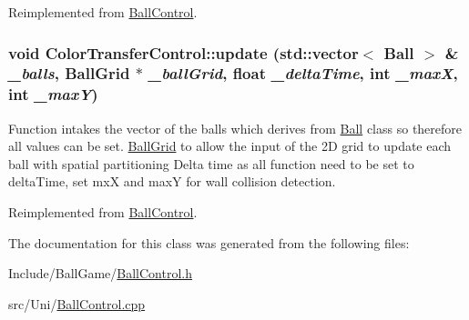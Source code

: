 Reimplemented from \hyperlink{classBallControl_a4f811993f5e8988eb4f4ab3c03dadf52}{BallControl}.\hypertarget{classColorTransferControl_acbe9581f0be7624c9bc33d40e2ee1a6b}{
\subsubsection[{update}]{\setlength{\rightskip}{0pt plus 5cm}void ColorTransferControl::update (std::vector$<$ {\bf Ball} $>$ \& {\em \_\-balls}, \/  {\bf BallGrid} $\ast$ {\em \_\-ballGrid}, \/  float {\em \_\-deltaTime}, \/  int {\em \_\-maxX}, \/  int {\em \_\-maxY})}}
\label{classColorTransferControl_acbe9581f0be7624c9bc33d40e2ee1a6b}
Function intakes the vector of the balls which derives from \hyperlink{structBall}{Ball} class so therefore all values can be set. \hyperlink{classBallGrid}{BallGrid} to allow the input of the 2D grid to update each ball with spatial partitioning Delta time as all function need to be set to deltaTime, set mxX and maxY for wall collision detection. 

Reimplemented from \hyperlink{classBallControl_af32a9b232b26af69231966ae3aab98d5}{BallControl}.

The documentation for this class was generated from the following files:\begin{DoxyCompactItemize}
\item 
Include/BallGame/\hyperlink{BallControl_8h}{BallControl.h}\item 
src/Uni/\hyperlink{BallControl_8cpp}{BallControl.cpp}\end{DoxyCompactItemize}
